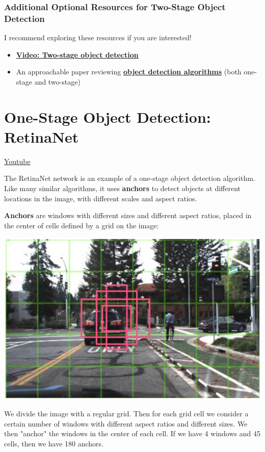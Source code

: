 \subsubsection{Additional Optional Resources for Two-Stage Object Detection}

I recommend exploring these resources if you are interested!

\begin{itemize}
    \item \href{https://www.youtube.com/watch?v=6I3m0SsLPo4}{\textbf{Video: Two-stage object detection}}
    \item An approachable paper reviewing \href{https://iopscience.iop.org/article/10.1088/1742-6596/1544/1/012033/meta}{\textbf{object detection algorithms}} (both one-stage and two-stage)
\end{itemize}

\section{One-Stage Object Detection: RetinaNet}
\href{https://www.youtube.com/watch?v=RaWxVVY6tXk&ab_channel=Udacity}{Youtube} \newline

The RetinaNet network is an example of a one-stage object detection algorithm. Like many similar algorithms, it uses \textbf{anchors} to detect objects at different locations in the image, with different scales and aspect ratios.\newline

\textbf{Anchors} are windows with different sizes and different aspect ratios, placed in the center of cells defined by a grid on the image:

\includegraphics[width=0.5\linewidth]{img//cnn//depth/anchors.jpeg}

We divide the image with a regular grid. Then for each grid cell we consider a certain number of windows with different aspect ratios and different sizes. We then "anchor" the windows in the center of each cell. If we have 4 windows and 45 cells, then we have 180 anchors. \newline

